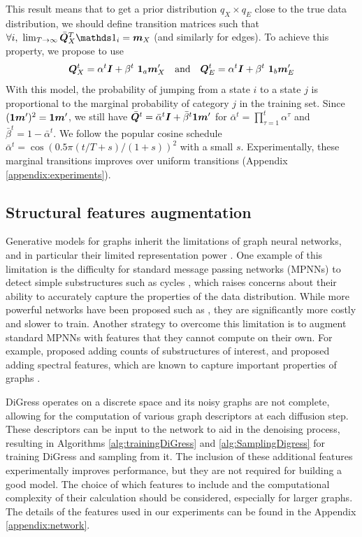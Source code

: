 \documentclass{article} %
\theoremstyle{plain}
\theoremstyle{definition}
\theoremstyle{remark}
\begin{document}
This result means that to get a prior distribution $q_X \times q_E$ close to the true data distribution, we should define transition matrices such that $\forall i,~ \lim_{T \to \infty} \bar \mQ^T_X \mathds 1_i= \vm_X$ (and similarly for edges). To achieve this property, we propose to use
\begin{equation}
{\bm{Q}}^t_X = \alpha^t {\bm{I}} + \beta^t ~\bm 1_a \bm {{\bm{m}}}_X' \quad \text{and} \quad 
{\bm{Q}}^t_E = \alpha^t {\bm{I}} + \beta^t ~\bm 1_b \bm {{\bm{m}}}_E'
\end{equation}
With this model, the probability of jumping from a state $i$ to a state $j$ is proportional to the marginal probability of category $j$ in the training set. 
Since $(\bm 1 \bm {{\bm{m}}}')^2 = \bm 1 \bm {{\bm{m}}}'$, we still have $\bar {{\bm{Q}}}^t = \bar \alpha^t {\bm{I}} + \bar \beta^t \bm 1 \bm {{\bm{m}}}'$ for $\bar\alpha^t = \prod_{\tau=1}^t \alpha^\tau$ and $\bar \beta^t = 1 - \bar\alpha^t$. 
We follow the popular cosine schedule $\bar \alpha^t = \cos{(0.5 \pi (t / T + s) / (1+s))}^2 $ with a small $s$.
Experimentally, these marginal transitions improves over uniform transitions (Appendix \ref{appendix:experiments}).


\subsection{Structural features augmentation}

Generative models for graphs inherit the limitations of graph neural networks, and in particular their limited representation power \citep{xu2018powerful, morris2019weisfeiler}. One example of this limitation is the difficulty for standard message passing networks (MPNNs) to detect simple substructures such as cycles \citep{chen2020can}, which raises concerns about their ability to accurately capture the properties of the data distribution. While more powerful networks have been proposed such as \citep{maron2019provably, vignac2020building, morris2022speqnets}, they are significantly more costly and slower to train. 
Another strategy to overcome this limitation is to augment standard MPNNs with features that they cannot compute on their own. For example, \citet{bouritsas2022improving} proposed adding counts of substructures of interest, and \citet{beaini2021directional} proposed adding spectral features, which are known to capture important properties of graphs \citep{chung1997spectral}. 

DiGress operates on a discrete space and its noisy graphs are not complete, allowing for the computation of various graph descriptors at each diffusion step. These descriptors can be input to the network to aid in the denoising process, resulting in Algorithms \ref{alg:trainingDiGress} and \ref{alg:SamplingDigress} for training DiGress and sampling from it. The inclusion of these additional features experimentally improves performance, but they are not required for building a good model. The choice of which features to include and the computational complexity of their calculation should be considered, especially for larger graphs. The details of the features used in our experiments can be found in the Appendix \ref{appendix:network}.
\end{document}
